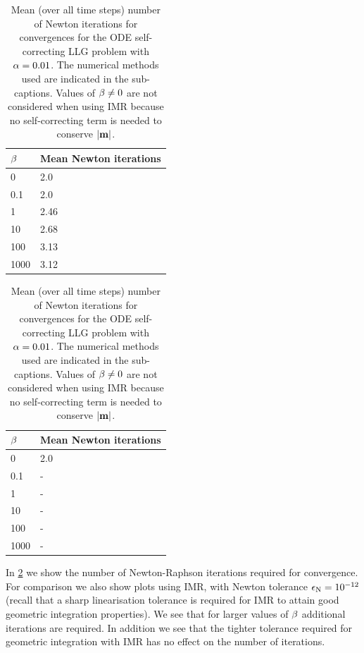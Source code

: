 \FloatBarrier %
\begin{table}
  \begin{subtable}{.5\textwidth}
    \centering
    \begin{tabular}{ll}
      $\beta$ & Mean Newton iterations \\
      \hline
      0 & 2.0 \\
      0.1 & 2.0 \\
      1 & 2.46 \\
      10 & 2.68 \\
      100 & 3.13 \\
      1000 & 3.12 \\
    \end{tabular}%
    \caption{Solved with BDF2 and $\ntol = 10^{-8}$}
  \end{subtable}%
  \begin{subtable}{.5\textwidth}
    \centering
    \begin{tabular}{ll}
      $\beta$ & Mean Newton iterations \\
      \hline
      0 & 2.0 \\
      0.1 & - \\
      1 & - \\
      10 & - \\
      100 & - \\
      1000 & - \\
    \end{tabular}%
    \vfill
    \caption{Solved with IMR and $\ntol = 10^{-12}$}
  \end{subtable}%
  \caption{
    Mean (over all time steps) number of Newton iterations for convergences
    for the ODE self-correcting LLG problem with
    $\alpha = 0.01$.
    The numerical methods used are indicated in the sub-captions.
    Values of $\beta \neq 0$ are not considered when using IMR because no self-correcting term is needed to conserve $\left|{\boldsymbol{\mathrm{m}}} \right|$.
  }
  \label{tab:sc-newton-iters}
\end{table}


In \cref{tab:sc-newton-iters} we show the number of Newton-Raphson iterations required for convergence.
For comparison we also show plots using IMR, with Newton tolerance $\ntol=10^{-12}$ (recall that a sharp linearisation tolerance is required for IMR to attain good geometric integration properties).
We see that for larger values of $\beta$ additional iterations are required.
In addition we see that the tighter tolerance required for geometric integration with IMR has no effect on the number of iterations.

